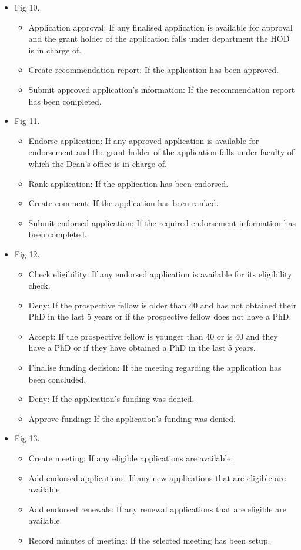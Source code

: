 \documentclass[12pt]{article}
\begin{document}
\begin{itemize}
	\item Fig 10.
		\begin{itemize}
			\item Application approval: If any finalised application is available for approval and the grant holder of the application falls under department the HOD is in charge of.
			\item Create recommendation report: If the application has been approved.				
			\item Submit approved application's information: If the recommendation report has been completed.									
		\end{itemize}
		
	\item Fig 11.
		\begin{itemize}
			\item Endorse application: If any approved application is available for endorsement and the grant holder of the application falls under faculty of which the Dean's office is in charge of.
			\item Rank application: If the application has been endorsed.	
			\item Create comment: If the application has been ranked.			
			\item Submit endorsed application: If the required endorsement information has been completed.									
		\end{itemize}
	
	\item Fig 12.
		\begin{itemize}
			\item Check eligibility: If any endorsed application is available for its eligibility check.
			\item Deny: If the prospective fellow is older than 40 and has not obtained their PhD in the last 5 years or if the prospective fellow does not have a PhD.
			\item Accept: If the prospective fellow is younger than 40 or is 40 and they have a PhD or if they have obtained a PhD in the last 5 years. 
			\item Finalise funding decision: If the meeting regarding the application has been concluded.	
			\item Deny: If the application's funding was denied.			
			\item Approve funding: If the application's funding was denied.									
		\end{itemize}
	
	\item Fig 13.
		\begin{itemize}
			\item Create meeting: If any eligible applications are available.
			\item Add endorsed applications: If any new applications that are eligible are available.
			\item Add endorsed renewals: If any renewal applications that are eligible are available.
			\item Record minutes of meeting: If the selected meeting has been setup.							
		\end{itemize}
	\end{itemize}
\end{document}

